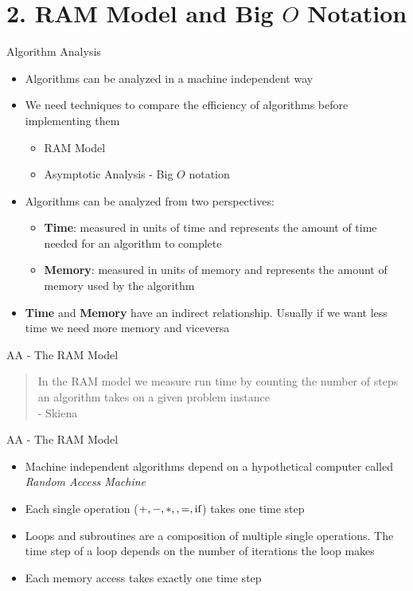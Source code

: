\documentclass{beamer}
\begin{document}
\section{2. RAM Model and Big $O$ Notation}
\begin{frame}{Algorithm Analysis}
    \begin{itemize}
        \item Algorithms can be analyzed in a machine independent way
        \item We need techniques to compare the efficiency of algorithms before implementing them
            \begin{itemize}
                \item RAM Model
                \item Asymptotic Analysis - Big $O$ notation
            \end{itemize}
        \item Algorithms can be analyzed from two perspectives:
            \begin{itemize}
                \item \textbf{Time}: measured in units of time and represents the amount of time needed for an algorithm to complete
                \item \textbf{Memory}: measured in units of memory and represents the amount of memory used by the algorithm 
            \end{itemize}
        \item \textbf{Time} and \textbf{Memory} have an indirect relationship. Usually if we want less time we need more memory and viceversa
    \end{itemize}
\end{frame}

\begin{frame}{AA - The RAM Model}
    \begin{quote}
        In the RAM model we measure run time by counting the number of steps an algorithm takes on a given problem instance \\
            - Skiena \cite{skiena}
    \end{quote}
\end{frame}

\begin{frame}{AA - The RAM Model}
    \begin{itemize}
        \item Machine independent algorithms depend on a hypothetical computer called \textit{Random Access Machine}
        \item Each single operation ($+, -, *, \/, =, \text{if}$) takes one time step
        \item Loops and subroutines are a composition of multiple single operations. The time step of a loop depends on the number of iterations the loop makes
        \item Each memory access takes exactly one time step
    \end{itemize}
\end{frame}
\end{document}
